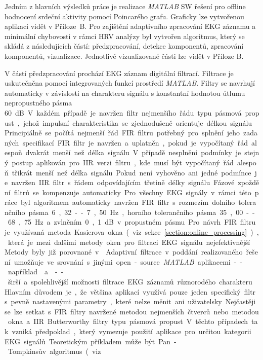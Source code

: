 Jedním z hlavních výsledků práce je realizace \textit{MATLAB} SW řešení pro
offline hodnocení srdeční aktivity pomocí Poincarého grafu. Graficky lze
vytvořenou aplikaci vidět v Příloze~B. Pro zajištění adaptivního zpracování EKG
záznamu a minimální chybovosti v rámci HRV analýzy byl vytvořen algoritmus,
který se skládá z následujících částí: předzpracování, detekce komponentů,
zpracování komponentů, vizualizace. Jednotlivě vizualizované části lze vidět v
Příloze B.

V částí předzpracování prochází EKG záznam digitální filtrací. Filtrace je
uskutečněna pomocí integrovaných funkcí prostředí \textit{MATLAB}. Filtry se
navrhují automaticky v závislosti na charakteru signálu s konstantní hodnotou
útlumu nepropustného pásma 60~\si\dB. V každém případě je navržen filtr
nejmenšího řádu typu pásmová propust, jehož impulsní charakteristika se
zjednodušeně orientuje délkou signálu. Principiálně se počítá nejmenší řád FIR
filtru potřebný pro splnění jeho zadaných specifikací. FIR filtr je navržen a
uplatněn, pokud je vypočítaný řád alespoň dvakrát menší než délka signálu. V
případě nesplnění podmínky je stejný postup aplikován pro IIR verzi filtru, kde
musí být vypočítaný řád alespoň třikrát menší než délka signálu. Pokud není
vyhověno ani jedné podmínce je navržen IIR filtr s řádem odpovídajícím třetině
délky signálu. Fázové zpoždění filtrů se kompenzuje automaticky. Pro všechny EKG
signály v rámci této práce byl algoritmem automaticky navržen FIR filtr s
rozmezím dolního tolerančního pásma 6,32--7,50~\si\Hz, horního tolerančního
pásma 35,00--68,75~\si\Hz~a zvlněním 0,1~\si\dB~v propustném pásmu. Pro návrh
FIR filtru je využívaná metoda Kasierova okna (viz
sekce~\ref{section:online_processing}), která je mezi dalšími metody oken pro
filtraci EKG signálu nejefektivnější. Metody byly již porovnané v
\cite{Kumar2014,Lakhwani2013,Yadav2011}. Adaptivní filtrace v poddání
realizovaného řešení umožňuje ve srovnání s jinými open-source \textit{MATLAB}
aplikacemi -- například~\cite{ecgkit}~a~\cite{Sedghamiz2018} -- širší a
spolehlivější možnosti filtrace EKG záznamů různorodého charakteru. Hlavním
důvodem je, že většina aplikací využívá pouze jeden specifický filtr s pevně
nastavenými parametry, které nelze měnit ani uživatelsky. Nejčastěji se lze
setkat s FIR filtry navržené metodou nejmenších čtverců nebo metodou okna a IIR
Butterworthy filtry typu pásmová propust. V těchto případech tak vzniká
předpoklad, který vymezuje použití aplikace pro určitou kategorii EKG signálů.
Teoretickým příkladem může být Pan-Tompkinsův algoritmus (viz

